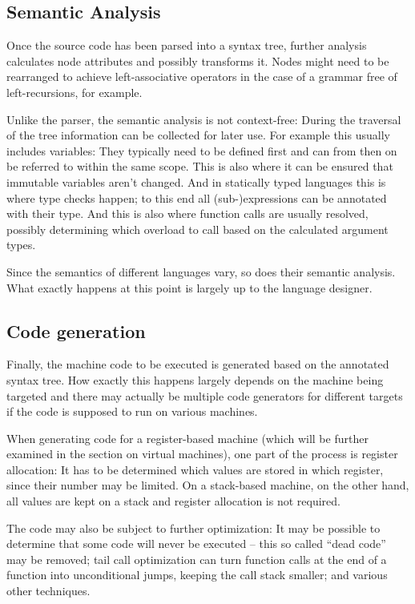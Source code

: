 		\subsection{Semantic Analysis}
		
		Once the source code has been parsed into a syntax tree, further analysis calculates node attributes and possibly transforms it. Nodes might need to be rearranged to achieve left-associative operators in the case of a grammar free of left-recursions, for example.
		
		Unlike the parser, the semantic analysis is not context-free: During the traversal of the tree information can be collected for later use. For example this usually includes variables: They typically need to be defined first and can from then on be referred to within the same scope. This is also where it can be ensured that immutable variables aren't changed. And in statically typed languages this is where type checks happen; to this end all (sub-)expressions can be annotated with their type. And this is also where function calls are usually resolved, possibly determining which overload to call based on the calculated argument types.
		
		Since the semantics of different languages vary, so does their semantic analysis. What exactly happens at this point is largely up to the language designer.
		
		
		\subsection{Code generation}
		
		Finally, the machine code to be executed is generated based on the annotated syntax tree. How exactly this happens largely depends on the machine being targeted and there may actually be multiple code generators for different targets if the code is supposed to run on various machines.
		
		When generating code for a register-based machine (which will be further examined in the section on virtual machines), one part of the process is register allocation: It has to be determined which values are stored in which register, since their number may be limited. On a stack-based machine, on the other hand, all values are kept on a stack and register allocation is not required.
		
		The code may also be subject to further optimization: It may be possible to determine that some code will never be executed -- this so called ``dead code'' may be removed; tail call optimization can turn function calls at the end of a function into unconditional jumps, keeping the call stack smaller; and various other techniques.

